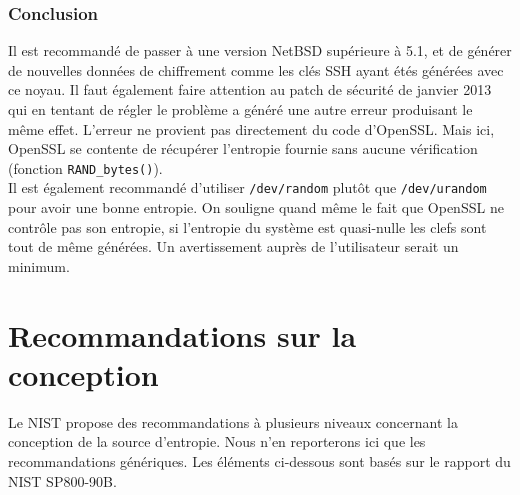 		\subsubsection{Conclusion}
			
			Il est recommandé de passer à une version NetBSD supérieure à 5.1, et de générer de nouvelles données de chiffrement comme les clés SSH ayant étés générées avec ce noyau. Il faut également faire attention au patch de sécurité de janvier 2013 qui en tentant de régler le problème a généré une autre erreur produisant le même effet. L'erreur ne provient pas directement du code d'OpenSSL. Mais ici, OpenSSL se contente de récupérer l'entropie fournie sans aucune vérification (fonction \texttt{RAND\_bytes()}).\\ 

			Il est également recommandé d'utiliser \texttt{/dev/random} plutôt que \texttt{/dev/urandom} pour avoir une bonne entropie. On souligne quand même le fait que OpenSSL ne contrôle pas son entropie, si l'entropie du système est quasi-nulle les clefs sont tout de même générées. Un avertissement auprès de l'utilisateur serait un minimum.
			
\section{Recommandations sur la conception}
Le NIST propose des recommandations à plusieurs niveaux concernant la conception de la source d'entropie. Nous n'en reporterons ici que les recommandations génériques. Les éléments ci-dessous sont basés sur le rapport du NIST SP800-90B.

